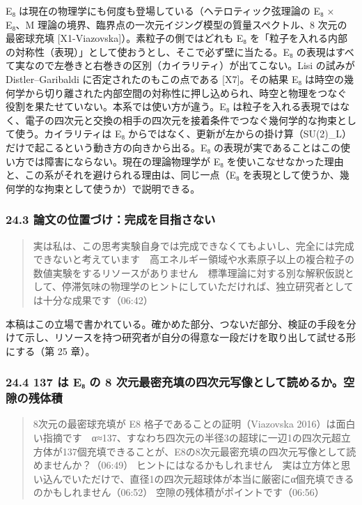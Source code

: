 \documentclass[
  a4paper,
]{ltjsarticle}
\begin{document}
E₈ は現在の物理学にも何度も登場している（ヘテロティック弦理論の E₈ ×
E₈、M 理論の境界、臨界点の一次元イジング模型の質量スペクトル、8
次元の最密球充填 {[}X1-Viazovska{]}）。素粒子の側ではどれも E₈
を「粒子を入れる内部の対称性（表現）」として使おうとし、そこで必ず壁に当たる。E₈
の表現はすべて実なので左巻きと右巻きの区別（カイラリティ）が出てこない。Lisi
の試みが Distler--Garibaldi に否定されたのもこの点である
{[}X7{]}。その結果 E₈
は時空の幾何学から切り離された内部空間の対称性に押し込められ、時空と物理をつなぐ役割を果たせていない。本系では使い方が違う。E₈
は粒子を入れる表現ではなく、電子の四次元と交換の相手の四次元を接着条件でつなぐ幾何学的な拘束として使う。カイラリティは
E₈
からではなく、更新が左からの掛け算（SU(2)\_L）だけで起こるという動き方の向きから出る。E₈
の表現が実であることはこの使い方では障害にならない。現在の理論物理学が
E₈
を使いこなせなかった理由と、この系がそれを避けられる理由は、同じ一点（E₈
を表現として使うか、幾何学的な拘束として使うか）で説明できる。

\subsubsection{24.3
論文の位置づけ：完成を目指さない}\label{ux8ad6ux6587ux306eux4f4dux7f6eux3065ux3051ux5b8cux6210ux3092ux76eeux6307ux3055ux306aux3044}

\begin{quote}
実は私は、この思考実験自身では完成できなくてもよいし、完全には完成できないと考えています　高エネルギー領域や水素原子以上の複合粒子の数値実験をするリソースがありません　標準理論に対する別な解釈仮説として、停滞気味の物理学のヒントにしていただければ、独立研究者としては十分な成果です（06:42）
\end{quote}

本稿はこの立場で書かれている。確かめた部分、つないだ部分、検証の手段を分けて示し、リソースを持つ研究者が自分の得意な一段だけを取り出して試せる形にする（第
25 章）。

\subsubsection{24.4 137 は E₈ の 8
次元最密充填の四次元写像として読めるか。空隙の残体積}\label{ux306f-eux2088-ux306e-8-ux6b21ux5143ux6700ux5bc6ux5145ux586bux306eux56dbux6b21ux5143ux5199ux50cfux3068ux3057ux3066ux8aadux3081ux308bux304bux7a7aux9699ux306eux6b8bux4f53ux7a4d}

\begin{quote}
8次元の最密球充填が E8 格子であることの証明（Viazovska
2016）は面白い指摘です　α≈137、すなわち四次元の半径3の超球に一辺1の四次元超立方体が137個充填できることが、E8の8次元最密充填の四次元写像として読めませんか？（06:49）
ヒントにはなるかもしれません　実は立方体と思い込んでいただけで、直径1の四次元超球体が本当に厳密にα個充填できるのかもしれません（06:52）
空隙の残体積がポイントです（06:56）
\end{quote}
\end{document}
